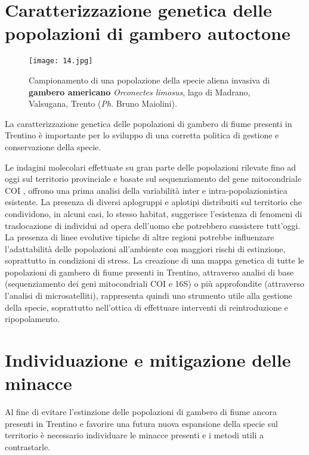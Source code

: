 \documentclass[10pt,twoside,openany,x11names,svgnames,italian,a5paper,dvipsnames,table]{memoir}
\newcommand{\ph}{\emph{Ph}. }
\begin{document}
\section{Caratterizzazione genetica delle popolazioni di gambero autoctone}

\begin{wrapfigure}[15]{l}{.6\textwidth}
\vspace{-.8cm}
\begin{center}
\texttt{[image: 14.jpg]}
\caption*{Campionamento di una popolazione della specie aliena invasiva di \textbf{gambero americano} \emph{Orconectes limosus}, lago di Madrano, Valsugana, Trento (\ph Bruno Maiolini).}
\end{center}
\end{wrapfigure}

La caratterizzazione genetica delle popolazioni di gambero di fiume presenti in Trentino è importante per lo sviluppo di una corretta politica di gestione e conservazione della specie. 

Le indagini molecolari effettuate su gran parte delle popolazioni rilevate fino ad oggi sul territorio provinciale e basate sul sequenziamento del gene mitocondriale COI \cite{Endrizzi13b}, offrono una prima analisi della variabilità inter e intra-popolazionistica esistente. La presenza di diversi aplogruppi e aplotipi distribuiti sul territorio che condividono, in alcuni casi, lo stesso habitat, suggerisce l’esistenza di fenomeni di traslocazione di individui ad opera dell’uomo che potrebbero sussistere tutt’oggi. La presenza di linee evolutive tipiche di altre regioni potrebbe influenzare l’adattabilità delle popolazioni all’ambiente con maggiori rischi di estinzione, soprattutto in condizioni di stress. La creazione di una mappa genetica di tutte le popolazioni di gambero di fiume presenti in Trentino, attraverso analisi di base (sequenziamento dei geni mitocondriali COI e 16S) o più approfondite (attraverso l’analisi di microsatelliti), rappresenta quindi uno strumento utile alla gestione della specie, soprattutto nell’ottica di effettuare interventi di reintroduzione e ripopolamento.

\section{Individuazione e mitigazione delle minacce}
Al fine di evitare l’estinzione delle popolazioni di gambero di fiume ancora presenti in Trentino e favorire una futura nuova espansione della specie sul territorio è necessario individuare le minacce presenti e i metodi utili a contrastarle. 
\end{document}

